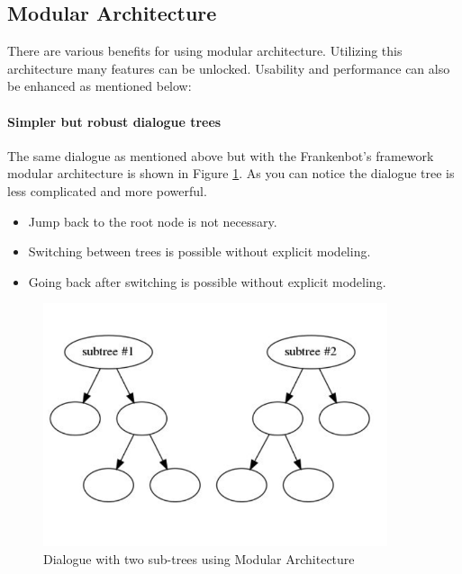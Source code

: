 \subsection{Modular Architecture}
There are various benefits for using modular architecture. 
Utilizing this architecture many features can be unlocked. Usability and performance can also be enhanced as mentioned below:

\paragraph*{Simpler but robust dialogue trees\label{par:simplerTree}}
The same dialogue as mentioned above but with the Frankenbot's framework modular architecture is shown in Figure \ref{fig:modArch2}. As you can notice the dialogue tree is less complicated and more powerful.
\begin{itemize}
\item Jump back to the root node is not necessary.
\item Switching between trees is possible without explicit modeling.       
\item Going back after switching is possible without explicit modeling.
\end{itemize}

\begin{figure}[!h]
    \centering
    \includegraphics[width=0.9\textwidth]{img/Modular_Architecture_2.PNG}
    \caption{Dialogue with two sub-trees using Modular Architecture}
    \label{fig:modArch2}
\end{figure}

